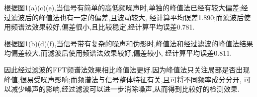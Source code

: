 \documentclass[12pt, a4paper, oneside]{ctexart}
\begin{document}
      根据图1(a)(c)(e),当信号有简单的高低频噪声时,单独的峰值法已经有较大偏差;经过滤波后的峰值法也有一定的偏差,且波动较大,
      经计算平均误差1.890;而滤波后使用频谱法效果较好,偏差很小,且比较稳定,经计算平均误差0.781.

      根据图1(b)(d)(f),当信号带有复杂的噪声和伪影时,峰值法和经过滤波的峰值法结果均偏差较大,而滤波后使用频谱法效果较好,偏差较小,
      经计算平均误差0.811.

      因此经过滤波的FFT频谱法效果相比峰值法更好.因为峰值法只关注局部是否出现峰值,很易受噪声影响;而频谱法与信号整体特征有关,且可将不同频率成分分开,
      可以减少噪声的影响,经过滤波可以进一步消除噪声,从而得到比较好的检测效果.
\end{document}
